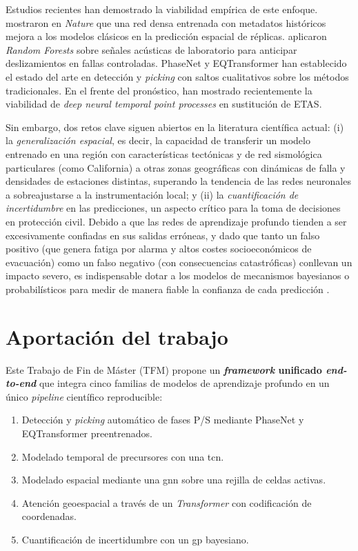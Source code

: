 Estudios recientes han demostrado la viabilidad empírica de este enfoque. \citet{devries2018aftershocks} mostraron en \textit{Nature} que una red densa entrenada con metadatos históricos mejora a los modelos clásicos en la predicción espacial de réplicas. \citet{rouetleroy2017slowslip} aplicaron \textit{Random Forests} sobre señales acústicas de laboratorio para anticipar deslizamientos en fallas controladas. PhaseNet \citep{zhu2018phasenet} y EQTransformer \citep{mousavi2020eqtransformer} han establecido el estado del arte en detección y \textit{picking} con saltos cualitativos sobre los métodos tradicionales. En el frente del pronóstico, \citet{vandenende2024forecasting} han mostrado recientemente la viabilidad de \textit{deep neural temporal point processes} en sustitución de ETAS.

Sin embargo, dos retos clave siguen abiertos en la literatura científica actual: (i) la \emph{generalización espacial}, es decir, la capacidad de transferir un modelo entrenado en una región con características tectónicas y de red sismológica particulares (como California) a otras zonas geográficas con dinámicas de falla y densidades de estaciones distintas, superando la tendencia de las redes neuronales a sobreajustarse a la instrumentación local; y (ii) la \emph{cuantificación de incertidumbre} en las predicciones, un aspecto crítico para la toma de decisiones en protección civil. Debido a que las redes de aprendizaje profundo tienden a ser excesivamente confiadas en sus salidas erróneas, y dado que tanto un falso positivo (que genera fatiga por alarma y altos costes socioeconómicos de evacuación) como un falso negativo (con consecuencias catastróficas) conllevan un impacto severo, es indispensable dotar a los modelos de mecanismos bayesianos o probabilísticos para medir de manera fiable la confianza de cada predicción \citep{gal2016mcdropout, rasmussen2006gp, jordan2011oef}.

\section{Aportación del trabajo}
\label{aportacion}

Este Trabajo de Fin de Máster (TFM) propone un \textbf{\textit{framework} unificado \textit{end-to-end}} que integra cinco familias de modelos de aprendizaje profundo en un único \emph{pipeline} científico reproducible:

\begin{enumerate}[label=\destacado{\arabic*.}]
  \setlength\itemsep{0.5em}
  \item Detección y \textit{picking} automático de fases P/S mediante PhaseNet y EQTransformer preentrenados.
  \item Modelado temporal de precursores con una \gls{tcn}.
  \item Modelado espacial mediante una \gls{gnn} sobre una rejilla de celdas activas.
  \item Atención geoespacial a través de un \textit{Transformer} con codificación de coordenadas.
  \item Cuantificación de incertidumbre con un \gls{gp} bayesiano.
\end{enumerate}

